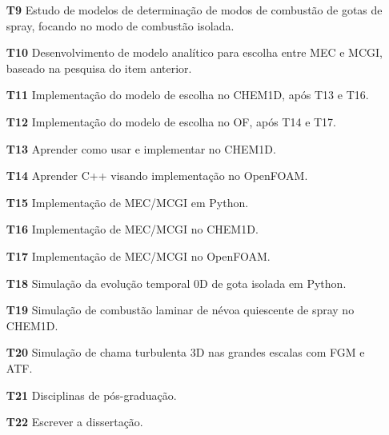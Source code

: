 \begin{itemize}
    \item[\textbf{T9}] Estudo de modelos de determinação de modos de combustão de gotas de spray, focando no modo de combustão isolada.%
    \item[\textbf{T10}] Desenvolvimento de modelo analítico para escolha entre MEC e MCGI, baseado na pesquisa do item anterior.
    \item[\textbf{T11}] Implementação do modelo de escolha no CHEM1D, após T13 e T16.
    \item[\textbf{T12}] Implementação do modelo de escolha no OF, após T14 e T17.
    
    \item[\textbf{T13}] Aprender como usar e implementar no CHEM1D.
    \item[\textbf{T14}] Aprender C++ visando implementação no OpenFOAM.
    
    \item[\textbf{T15}] Implementação de MEC/MCGI em Python.%
    \item[\textbf{T16}] Implementação de MEC/MCGI no CHEM1D.%
    \item[\textbf{T17}] Implementação de MEC/MCGI no OpenFOAM.%
    
    \item[\textbf{T18}] Simulação da evolução temporal 0D de gota isolada em Python.           %
    \item[\textbf{T19}] Simulação de combustão laminar de névoa quiescente de spray no CHEM1D. %
    \item[\textbf{T20}] Simulação de chama turbulenta 3D nas grandes escalas com FGM e ATF.    %
    
    \item[\textbf{T21}] Disciplinas de pós-graduação.%
    \item[\textbf{T22}] Escrever a dissertação.%
\end{itemize}

